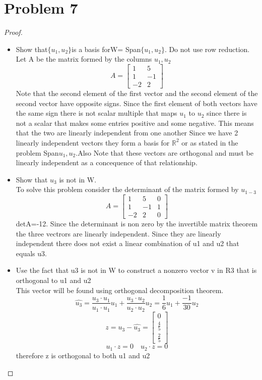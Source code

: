 \documentclass[12pt]{article}
\newcommand{\sect}[1]{\section*{#1}}
\newcommand{\R}{\mathbb{R}}
\begin{document}
\sect{Problem 7}
\begin{proof}
  \begin{itemize}
    \item Show that$\{u_1,u_2\}$is a basis forW= Span$\{u_1,u_2\}$.  Do not use row reduction.\\
    Let A be the matrix formed by the columns $u_1,u_2$
    \[
      A=\begin{bmatrix}
        1&5\\1&-1\\-2&2
    \end{bmatrix}
    \]
    Note that the second element of the first vector and the second element of the second vector have opposite signs. Since the first element of both vectors have the same sign there is not scalar multiple that maps $u_1$ to $u_2$ since there is not a scalar that makes some entries positive and some negative. This means that the two are linearly independent from one another Since we have 2 linearly independent vectors they form a basis for $\R^2$ or as stated in the problem Span{$u_1,u_2$}.Also Note that these vectors are orthogonal and must be linearly independent as a concequence of that relationship.
    \item Show that $u_3$ is not in W.\\
    To solve this problem consider the determinant of the matrix formed by $u_{1-3}$
    \[
      A=\begin{bmatrix}
        1&5&0\\1&-1&1\\-2&2&0
    \end{bmatrix}
    \]
    detA=-12. Since the determinant is non zero by the invertible matrix theorem the three vectrors are linearly independent. Since they are linearly independent there does not exist a linear combination of u1 and u2 that equals u3.
    \item Use the fact that u3 is not in W to construct a nonzero vector v in R3 that is orthogonal to u1 and u2\\ This vector will be found using orthogonal decomposition theorem.
    \[
      \hat{u_3}=\frac{u_3 \cdot u_1}{u_1 \cdot u_1}u_1+\frac{u_3\cdot u_2}{u_2\cdot u_2}u_2=\frac{1}{6}u_1+ \frac{-1}{30}u_2
    \]
    \[
      z=u_3-\hat{u_3}=\begin{bmatrix}
        0\\\frac{4}{5}\\\frac{2}{5}
    \end{bmatrix}
    \]
  \[
    u_1 \cdot z =0 \quad u_2 \cdot z =0
  \]
  therefore z is orthogonal to both u1 and u2
  \end{itemize}
\end{proof}
\end{document}
